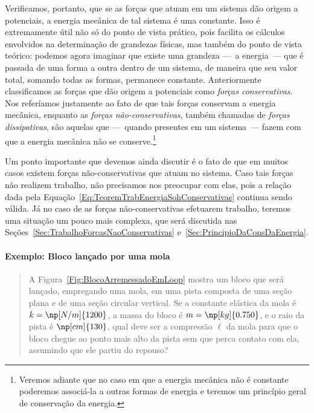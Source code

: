 Verificamos, portanto, que se as forças que atuam em um sistema dão origem a potenciais, a energia mecânica de tal sistema é uma constante. Isso é extremamente útil não só do ponto de vista prático, pois facilita os cálculos envolvidos na determinação de grandezas físicas, mas também do ponto de vista teórico: podemos agora imaginar que existe uma grandeza ---~a energia~--- que é passada de uma forma a outra dentro de um sistema, de maneira que seu valor total, somando todas as formas, permanece constante. Anteriormente classificamos as forças que dão origem a potenciais como \emph{forças conservativas}. Nos referíamos justamente ao fato de que tais forças conservam a energia mecânica, enquanto as \emph{forças não-conservativas}, também chamadas de \emph{forças dissipativas}, são aquelas que ---~quando presentes em um sistema~--- fazem com que a energia mecânica não se conserve.\footnote{Veremos adiante que no caso em que a energia mecânica não é constante poderemos associá-la a outras formas de energia e teremos um princípio geral de conservação da energia.}

Um ponto importante que devemos ainda discutir é o fato de que em muitos casos existem forças não-conservativas que atuam no sistema. Caso tais forças não realizem trabalho, não precisamos nos preocupar com elas, pois a relação dada pela Equação~\eqref{Eq:TeoremTrabEnergiaSohConservativas} continua sendo válida. Já no caso de as forças não-conservativas efetuarem trabalho, teremos uma situação um pouco mais complexa, que será discutida nas Seções~\ref{Sec:TrabalhoForcasNaoConservativas} e~\ref{Sec:PrincipioDaConsDaEnergia}.

\paragraph{Exemplo: Bloco lançado por uma mola}

\begin{quote}
    A Figura~\ref{Fig:BlocoArremessadoEmLoop} mostra um bloco que será lançado, empregando uma mola, em uma pista composta de uma seção plana e de uma seção circular vertical. Se a constante elástica da mola é $k = \np[N/m]{1200}$, a massa do bloco é $m = \np[kg]{0.750}$, e o raio da pista é $\np[cm]{130}$, qual deve ser a compressão $\ell$ da mola para que o bloco chegue ao ponto mais alto da pista sem que perca contato com ela, assumindo que ele partiu do repouso?
\end{quote}

